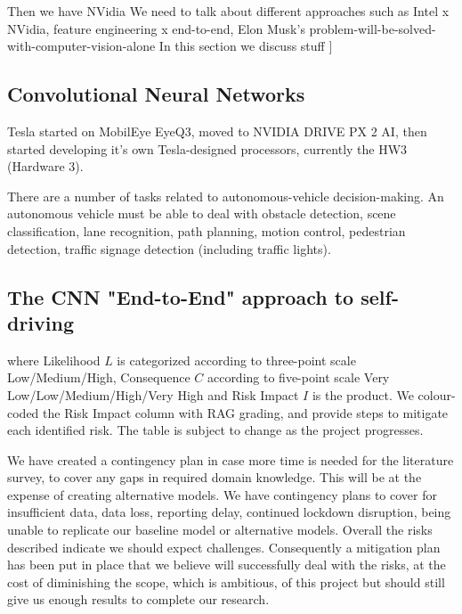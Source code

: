 Then we have NVidia
We need to talk about different approaches such as Intel x NVidia, feature engineering x end-to-end, Elon Musk's problem-will-be-solved-with-computer-vision-alone
In this section we discuss stuff ]

\subsection{Convolutional Neural Networks}

Tesla started on MobilEye EyeQ3, moved to NVIDIA DRIVE PX 2 AI, then started developing it's own Tesla-designed processors, currently the HW3 (Hardware 3).

There are a number of tasks related to autonomous-vehicle decision-making. An autonomous vehicle must be able to deal with obstacle detection, scene classification, lane recognition, path planning, motion control, pedestrian detection, traffic signage detection (including traffic lights). 



\subsection{The CNN "End-to-End" approach to self-driving}


where Likelihood $L$ is categorized according to three-point scale 
Low/Medium/High, Consequence $C$ according to five-point
scale Very Low/Low/Medium/High/Very High and Risk Impact $I$ is the product. We colour-coded the Risk Impact column with RAG grading, and provide steps to mitigate each identified risk. The table is subject to change as the project progresses.

We have created a contingency plan in case more time is needed for the literature survey, to cover any gaps in required domain knowledge. This will be at the expense of creating alternative models. We have contingency plans to cover for insufficient data, data loss, reporting delay, continued lockdown disruption, being unable to replicate our baseline model or alternative models. Overall the risks described indicate we should expect challenges. Consequently a mitigation plan has been put in place that we believe will successfully deal with the risks, at the cost of diminishing the scope, which is ambitious, of this project but should still give us enough results to complete our research.